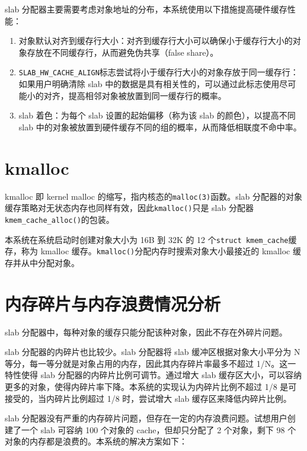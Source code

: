 \documentclass[AutoFakeBold]{LZUThesis}
\begin{document}
\begin{sloppypar}
slab
分配器主要需要考虑对象地址的分布，本系统使用以下措施提高硬件缓存性能：

\begin{enumerate}
\def\labelenumi{\arabic{enumi}.}
\item
  对象默认对齐到缓存行大小：对齐到缓存行大小可以确保小于缓存行大小的对象存放在不同缓存行，从而避免伪共享（false share）。
\item
  \texttt{SLAB\_HW\_CACHE\_ALIGN}标志尝试将小于缓存行大小的对象存放于同一缓存行：如果用户明确清除
  slab
  中的数据是具有相关性的，可以通过此标志使用尽可能小的对齐，提高相邻对象被放置到同一缓存行的概率。
\item
  slab 着色：为每个 slab 设置的起始偏移（称为该 slab
  的颜色），以提高不同 slab
  中的对象被放置到硬件缓存不同的组的概率，从而降低相联度不命中率。
\end{enumerate}


\section{kmalloc}

kmalloc 即 kernel malloc 的缩写，指内核态的\texttt{malloc(3)}函数。slab
分配器的对象缓存策略对无状态内存也同样有效，因此\texttt{kmalloc()}只是
slab 分配器\texttt{kmem\_cache\_alloc()}的包装。

本系统在系统启动时创建对象大小为 16B 到 32K 的 12
个\texttt{struct\ kmem\_cache}缓存，称为 kmalloc
缓存。\texttt{kmalloc()}分配内存时搜索对象大小最接近的 kmalloc
缓存并从中分配对象。


\section{内存碎片与内存浪费情况分析}

slab 分配器中，每种对象的缓存只能分配该种对象，因此不存在外碎片问题。

slab 分配器的内碎片也比较少。slab 分配器将 slab 缓冲区根据对象大小平分为
N 等分，每一等分就是对象占用的内存，因此其内存碎片率最多不超过
1/N。这一特性使得 slab 分配器的内碎片比例可调节。通过增大 slab
缓存区大小，可以容纳更多的对象，使得内碎片率下降。本系统的实现认为内碎片比例不超过
1/8 是可接受的，当内碎片比例超过 1/8 时，尝试增大 slab
缓存区来降低内碎片比例。

slab
分配器没有严重的内存碎片问题，但存在一定的内存浪费问题。试想用户创建了一个
slab 可容纳 100 个对象的 cache，但却只分配了 2 个对象，剩下 98
个对象的内存都是浪费的。本系统的解决方案如下：


\end{sloppypar}
\end{document}
